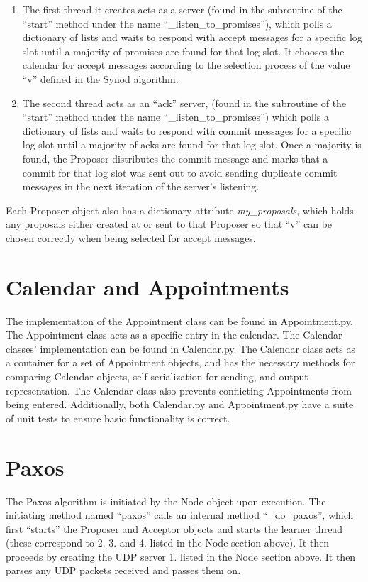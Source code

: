 \documentclass{article}
\begin{document}
		\begin{enumerate}
			\item The first thread it creates acts as a server (found in the subroutine of the ``start'' method under the name ``\_listen\_to\_promises''), which polls a dictionary of lists and waits to respond with accept messages for a specific log slot until a majority of promises are found for that log slot. It chooses the calendar for accept messages according to the selection process of the value ``v'' defined in the Synod algorithm.
			\item The second thread acts as an ``ack'' server, (found in the subroutine of the ``start'' method under the name ``\_listen\_to\_promises'') which polls a dictionary of lists and waits to respond with commit messages for a specific log slot until a majority of acks are found for that log slot. Once a majority is found, the Proposer distributes the commit message and marks that a commit for that log slot was sent out to avoid sending duplicate commit messages in the next iteration of the server's listening.
		\end{enumerate}
	
		\noindent Each Proposer object also has a dictionary attribute \textit{my\_proposals}, which holds any proposals either created at or sent to that Proposer so that ``v'' can be chosen correctly when being selected for accept messages.

	\section{Calendar and Appointments}
		The implementation of the Appointment class can be found in Appointment.py. The Appointment class acts as a specific entry in the calendar. The Calendar classes' implementation can be found in Calendar.py. The Calendar class acts as a container for a set of Appointment objects, and has the necessary methods for comparing Calendar objects, self serialization for sending, and output representation. The Calendar class also prevents conflicting Appointments from being entered. Additionally, both Calendar.py and Appointment.py have a suite of unit tests to ensure basic functionality is correct.

	\section{Paxos}
		The Paxos algorithm is initiated by the Node object upon execution. The initiating method named ``paxos'' calls an internal method ``\_do\_paxos'', which first ``starts'' the Proposer and Acceptor objects and starts the learner thread (these correspond to 2. 3. and 4. listed in the Node section above). It then proceeds by creating the UDP server 1. listed in the Node section above. It then parses any UDP packets received and passes them on.
\end{document}
